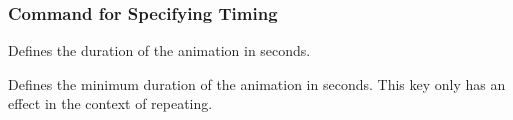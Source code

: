 \subsubsection{Command for Specifying Timing}


\begin{command}{\pgfsys@animation@dur{}}
  Defines the duration of the animation in seconds.
\begin{codeexample}[]
\def\showclock{
  \begin{scope}[name=clock]
    \fill circle[radius=9mm];
    \foreach \s in {0,5,...,55} 
      \node at (90-\s*6:1.1cm)[font=\tiny] {\s s};
    \foreach \s in {0,1,...,59} 
      \draw [white,very thin] (0,0) -- (90-\s*6:9mm);
    \node [below] {Click here};
    \fill [black] (-2pt,0pt) -- (90:0.9cm) -- (2pt,0pt) -- (0pt,-2pt) -- cycle
      [animate={begin on={click,of=clock}, 60s,
        max duration=10s, rotate={360...0}}];
  \end{scope}
}
\end{codeexample}
\end{command}

\begin{command}{\pgfsys@animation@min{}}
  Defines the minimum duration of the animation in seconds. This key
  only has an effect in the context of repeating.
\end{command}





